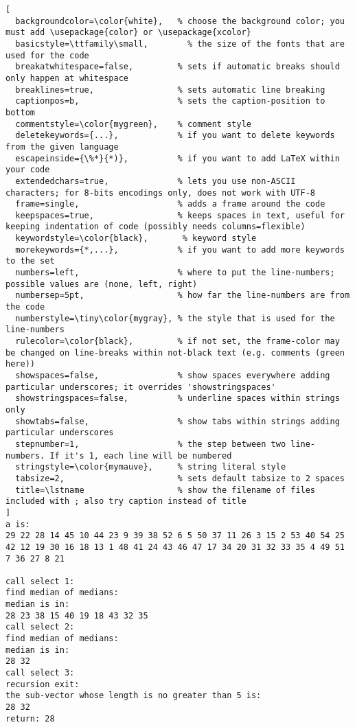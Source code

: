 \documentclass{article}
\begin{document}
\begin{CJK*}{UTF8}{gbsn}
\begin{lstlisting}[
  backgroundcolor=\color{white},   % choose the background color; you must add \usepackage{color} or \usepackage{xcolor}
  basicstyle=\ttfamily\small,        % the size of the fonts that are used for the code
  breakatwhitespace=false,         % sets if automatic breaks should only happen at whitespace
  breaklines=true,                 % sets automatic line breaking
  captionpos=b,                    % sets the caption-position to bottom
  commentstyle=\color{mygreen},    % comment style
  deletekeywords={...},            % if you want to delete keywords from the given language
  escapeinside={\%*}{*)},          % if you want to add LaTeX within your code
  extendedchars=true,              % lets you use non-ASCII characters; for 8-bits encodings only, does not work with UTF-8
  frame=single,                    % adds a frame around the code
  keepspaces=true,                 % keeps spaces in text, useful for keeping indentation of code (possibly needs columns=flexible)
  keywordstyle=\color{black},       % keyword style
  morekeywords={*,...},            % if you want to add more keywords to the set
  numbers=left,                    % where to put the line-numbers; possible values are (none, left, right)
  numbersep=5pt,                   % how far the line-numbers are from the code
  numberstyle=\tiny\color{mygray}, % the style that is used for the line-numbers
  rulecolor=\color{black},         % if not set, the frame-color may be changed on line-breaks within not-black text (e.g. comments (green here))
  showspaces=false,                % show spaces everywhere adding particular underscores; it overrides 'showstringspaces'
  showstringspaces=false,          % underline spaces within strings only
  showtabs=false,                  % show tabs within strings adding particular underscores
  stepnumber=1,                    % the step between two line-numbers. If it's 1, each line will be numbered
  stringstyle=\color{mymauve},     % string literal style
  tabsize=2,                       % sets default tabsize to 2 spaces
  title=\lstname                   % show the filename of files included with ; also try caption instead of title
]
a is:
29 22 28 14 45 10 44 23 9 39 38 52 6 5 50 37 11 26 3 15 2 53 40 54 25 42 12 19 30 16 18 13 1 48 41 24 43 46 47 17 34 20 31 32 33 35 4 49 51 7 36 27 8 21 

call select 1:
find median of medians:
median is in:
28 23 38 15 40 19 18 43 32 35 
call select 2:
find median of medians:
median is in:
28 32 
call select 3:
recursion exit:
the sub-vector whose length is no greater than 5 is:
28 32 
return: 28



\end{lstlisting}
\end{CJK*}
\end{document}
